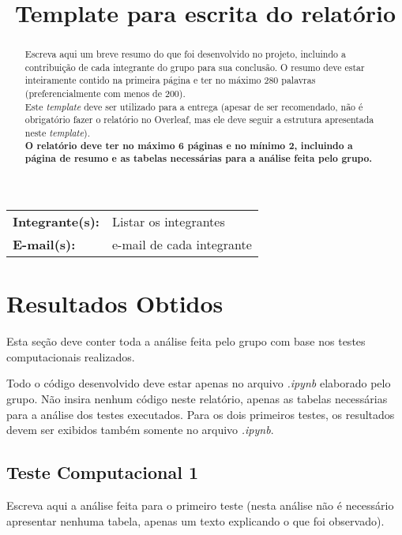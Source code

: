\documentclass{article}
\title{Template para escrita do relatório}
\date{}
\begin{document}
\maketitle

\begin{tabular}{lp{10cm}}
     \textbf{Integrante(s):}& Listar os integrantes\\
     \textbf{E-mail(s):} & e-mail de cada integrante\\
\end{tabular}

\begin{abstract}
Escreva aqui um breve resumo do que foi desenvolvido no projeto, incluindo a contribuição de cada integrante do grupo para sua conclusão. O resumo deve estar inteiramente contido na primeira página e ter no máximo 280 palavras (preferencialmente com menos de 200).\\  
Este \textit{template} deve ser utilizado para a entrega (apesar de ser recomendado, não é obrigatório fazer o relatório no Overleaf, mas ele deve seguir a estrutura apresentada neste \textit{template}).\\  
\textbf{O relatório deve ter no máximo 6 páginas e no mínimo 2, incluindo a página de resumo e as tabelas necessárias para a análise feita pelo grupo.}

\end{abstract}

\newpage

\section{Resultados Obtidos}
\label{sec:intro}

Esta seção deve conter toda a análise feita pelo grupo com base nos testes computacionais realizados.

Todo o código desenvolvido deve estar apenas no arquivo \textit{.ipynb} elaborado pelo grupo. Não insira nenhum código neste relatório, apenas as tabelas necessárias para a análise dos testes executados. Para os dois primeiros testes, os resultados devem ser exibidos também somente no arquivo \textit{.ipynb}. 

\subsection{Teste Computacional 1}

Escreva aqui a análise feita para o primeiro teste (nesta análise não é necessário apresentar nenhuma tabela, apenas um texto explicando o que foi observado).
\end{document}
